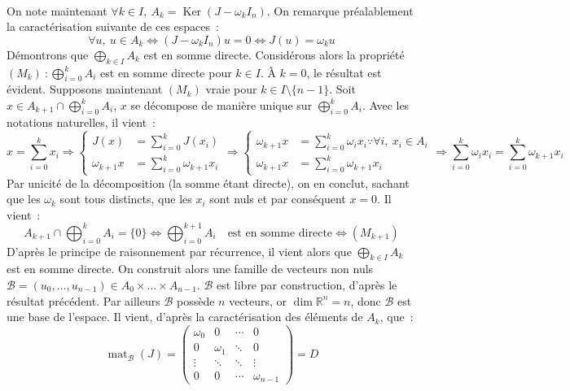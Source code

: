 \documentclass{article}
\DeclareMathOperator{\Ker}{Ker}
\DeclareMathOperator{\mat}{mat}
\begin{document}
  \paragraph{} On note maintenant $\forall k\in I,\: A_k = \Ker(J - \omega_k I_n)$. On remarque préalablement la caractérisation suivante de ces espaces~:
  \[
    \forall u,\: u\in A_k \iff (J - \omega_k I_n)u = 0 \iff J(u) = \omega_k u
  \]
  Démontrons que $\bigoplus_{k\in I} A_k$ est en somme directe. Considérons alors la propriété $(M_k)~: \bigoplus_{i=0}^k A_i$ est en somme directe pour $k\in I$. À $k=0$, le résultat est évident. Supposons maintenant $(M_k)$ vraie pour $k\in I\setminus\{n-1\}$. Soit $x\in A_{k+1} \cap \bigoplus_{i=0}^k A_i$, $x$ se décompose de manière unique sur $\bigoplus_{i=0}^k A_i$. Avec les notations naturelles, il vient~:
  \[
    x = \sum_{i=0}^k x_i \Longrightarrow \left\{\begin{aligned}
      J(x) &= \sum_{i=0}^k J(x_i) \\
      \omega_{k+1} x &= \sum_{i=0}^k \omega_{k+1} x_i
    \end{aligned}\right.
    \Longrightarrow \left\{\begin{aligned}
      \omega_{k+1} x &= \sum_{i=0}^k \omega_i x_i \because \forall i,\: x_i \in A_i\\
      \omega_{k+1} x &= \sum_{i=0}^k \omega_{k+1} x_i
    \end{aligned}\right.
    \Longrightarrow \sum_{i=0}^k \omega_i x_i = \sum_{i=0}^k \omega_{k+1} x_i
  \]
  Par unicité de la décomposition (la somme étant directe), on en conclut, sachant que les $\omega_k$ sont tous distincts, que les $x_i$ sont nuls et par conséquent $x=0$. Il vient~:
  \[
    A_{k+1} \cap \bigoplus_{i=0}^k A_i = \{0\} \iff \bigoplus_{i=0}^{k+1} A_i \quad\text{est en somme directe} \iff (M_{k+1})
  \]
  D'après le principe de raisonnement par récurrence, il vient alors que $\bigoplus_{k\in I} A_k$ est en somme directe. On construit alors une famille de vecteurs non nuls $\mathcal{B} = (u_0, \dots, u_{n-1}) \in A_0 \times \dots \times A_{n-1}$. $\mathcal{B}$ est libre par construction, d'après le résultat précédent. Par ailleurs $\mathcal{B}$ possède $n$ vecteurs, or $\dim \mathbb{R}^n = n$, donc $\mathcal{B}$ est une base de l'espace. Il vient, d'après la caractérisation des éléments de $A_k$, que~:
  \[
    \mat_{\mathcal{B}}(J) = \begin{pmatrix}
      \omega_0 & 0 & \cdots & 0 \\
      0 & \omega_1 & \ddots & 0 \\
      \vdots & \ddots & \ddots & \vdots \\
      0 & 0 & \cdots & \omega_{n-1}
    \end{pmatrix} = D
  \]
\end{document}
